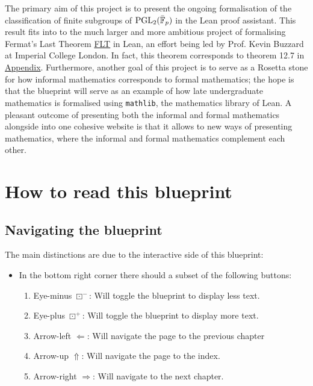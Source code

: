 The primary aim of this project is to present the ongoing formalisation of the classification of finite subgroups of $\operatorname{PGL}_2(\bar{\mathbb{F}}_p)$ in the Lean proof assistant. This result fits into to the much larger and more ambitious project
of formalising Fermat's Last Theorem \href{https://imperialcollegelondon.github.io/FLT/blueprint/}{FLT} in Lean, an effort being led by Prof. Kevin Buzzard at Imperial College London. In fact, this theorem corresponds to theorem 12.7 in \href{https://imperialcollegelondon.github.io/FLT/blueprint/ch_bestiary.html}{Appendix}.
Furthermore, another goal of this project is to serve as a Rosetta stone for how informal mathematics corresponds to formal mathematics; the hope is that the blueprint will serve as an example of how late undergraduate mathematics is formalised using \texttt{mathlib}, the mathematics library of Lean.
A pleasant outcome of presenting both the informal and formal mathematics alongside into one cohesive website is that it allows to new ways of presenting mathematics, where the informal and formal mathematics complement each other.


\section{How to read this blueprint}

\subsection{Navigating the blueprint}

The main distinctions are due to the interactive side of this blueprint:

\begin{itemize}
    \item In the bottom right corner there should a subset of the following buttons: 
        \begin{enumerate}
            \item Eye-minus $\boxdot^-$: Will toggle the blueprint to display less text.
            \item Eye-plus $\boxdot^+$: Will toggle the blueprint to display more text. 
            \item Arrow-left $\Leftarrow$: Will navigate the page to the previous chapter
            \item Arrow-up $\Uparrow$: Will navigate the page to the index.
            \item Arrow-right $\Rightarrow$: Will navigate to the next chapter.
        \end{enumerate}
\end{itemize}

